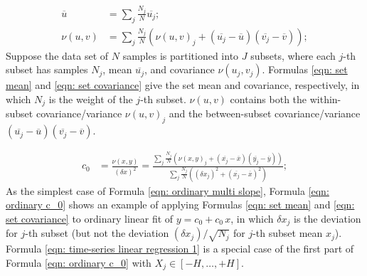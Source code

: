 \documentclass[twoside]{article}
\numberwithin{equation}{section}
\begin{document}
\begin{align}
\label{eqn: set mean}
\overline{u} &= \sum_{j} \frac{N_j}{N} \overline{u_j}; \\
\label{eqn: set covariance}
\nu(u, v) &= \sum_j \frac{N_j}{N} \left( \nu(u, v)_j + (\overline{u_j} - \overline{u})(\overline{v_j} - \overline{v}) \right);
\end{align}
Suppose the data set of $N$ samples is partitioned into $J$ subsets, where each $j$-th subset has samples $N_j$, mean $\overline{u_j}$, and covariance $\nu(u_j, v_j)$. 
Formulas \eqref{eqn: set mean} and \eqref{eqn: set covariance} give the set mean and covariance, respectively, in which $N_j$ is the weight of the $j$-th subset.
$\nu(u, v)$ contains both the within-subset covariance/variance $\nu(u, v)_j$ and the between-subset covariance/variance $(\overline{u_j} - \overline{u})(\overline{v_j} - \overline{v})$.

\begin{align}
\label{eqn: ordinary c_0}
c_0 &= \frac{\nu(x, y)}{(\delta x)^2} = \frac{\sum_j \frac{N_j}{N} \left( \nu(x, y)_j + (\overline{x_j} - \overline{x})(\overline{y_j} - \overline{y}) \right)}{\sum_j \frac{N_j}{N} \left( (\delta x_j)^2 + (\overline{x_j} - \overline{x})^2 \right)}; 
\end{align}
As the simplest case of Formula \eqref{eqn: ordinary multi slope}, Formula \eqref{eqn: ordinary c_0} shows an example of applying Formulas \eqref{eqn: set mean} and \eqref{eqn: set covariance} to ordinary linear fit of $y = c_0 + c_0\, x$, in which $\delta x_j$ is the deviation for $j$-th subset (but not the deviation $(\delta x_j)/\sqrt{N_j}$ for $j$-th subset mean $x_j$).
Formula \eqref{eqn: time-series linear regression 1} is a special case of the first part of Formula \eqref{eqn: ordinary c_0} with $X_j \in [-H,\dots,+H]$.
\end{document}
